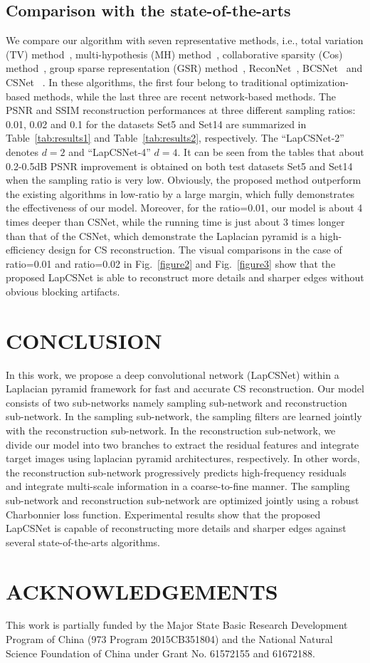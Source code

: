 \documentclass{article}
\begin{document}
\subsection{Comparison with the state-of-the-arts}
\label{sec:typestyle}
We compare our algorithm with seven representative methods, i.e., total variation (TV) method~\cite{li1tval3}, multi-hypothesis (MH) method~\cite{chen2011compressed}, collaborative sparsity (Cos) method~\cite{zhang2012compressed}, group sparse representation (GSR) method~\cite{zhang2014group}, ReconNet~\cite{kulkarni2016reconnet}, BCSNet~\cite{adler2016deep} and CSNet ~\cite{shi2017deep}. In these algorithms, the first four belong to traditional optimization-based methods, while the last three are recent network-based methods. The PSNR and SSIM reconstruction performances at three different sampling ratios: 0.01, 0.02 and 0.1 for the datasets Set5 and Set14 are summarized in Table~\ref{tab:results1} and Table~\ref{tab:results2}, respectively. The ``LapCSNet-2'' denotes $d=2$ and ``LapCSNet-4'' $d=4$. It can be seen from the tables that about 0.2-0.5dB PSNR improvement is obtained on both test datasets Set5 and Set14 when the sampling ratio is very low. Obviously, the proposed method outperform the existing algorithms in low-ratio by a large margin, which fully demonstrates the effectiveness of our model. Moreover, for the ratio=0.01, our model is about 4 times deeper than CSNet, while the running time is just about 3 times longer than that of the CSNet, which demonstrate the Laplacian pyramid is a high-efficiency design for CS reconstruction. The visual comparisons in the case of ratio=0.01 and ratio=0.02 in Fig.~\ref{figure2} and Fig.~\ref{figure3} show that the proposed LapCSNet is able to reconstruct more details and sharper edges without obvious blocking artifacts.

\section{CONCLUSION}
\label{sec:conclusion}
In this work, we propose a deep convolutional network (LapCSNet) within a Laplacian pyramid framework for fast and accurate CS reconstruction. Our model consists of two sub-networks namely sampling sub-network and reconstruction sub-network. In the sampling sub-network, the sampling filters are learned jointly with the reconstruction sub-network. In the reconstruction sub-network, we divide our model into two branches to extract the residual features and integrate target images using laplacian pyramid architectures, respectively. In other words, the reconstruction sub-network progressively predicts high-frequency residuals and integrate multi-scale information in a coarse-to-fine manner. The sampling sub-network and reconstruction sub-network are optimized jointly using a robust Charbonnier loss function. Experimental results show that the proposed LapCSNet is capable of reconstructing more details and sharper edges against several state-of-the-arts algorithms.

\section{ACKNOWLEDGEMENTS}
This work is partially funded by the Major State Basic Research Development Program of China (973 Program 2015CB351804) and the National Natural Science Foundation of China under Grant No. 61572155 and 61672188.




\end{document}
